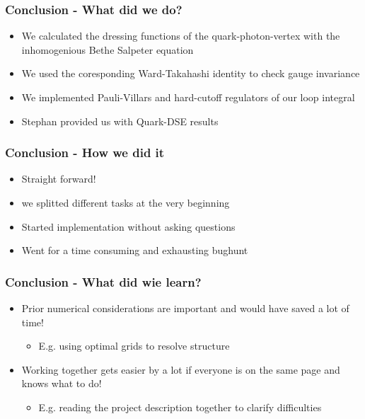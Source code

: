 \begin{frame}
	\frametitle{Conclusion - What did we do?}
			\begin{itemize}
				\item We calculated the dressing functions of the quark-photon-vertex with the inhomogenious Bethe Salpeter equation
					\vspace{2mm}
				\item We used the coresponding Ward-Takahashi identity to check gauge invariance
					\vspace{2mm}
				\item We implemented Pauli-Villars and hard-cutoff regulators of our loop integral 
					\vspace{2mm}
				\item Stephan provided us with Quark-DSE results
			\end{itemize}
\end{frame}

\begin{frame}
	\frametitle{Conclusion - How we did it} 
			\begin{itemize}
				\item Straight forward!
					\vspace{2mm}
				\item we splitted different tasks at the very beginning
					\vspace{2mm}
				\item Started implementation without asking questions
					\vspace{2mm}
				\item Went for a time consuming and exhausting bughunt
			\end{itemize}
\end{frame}


\begin{frame}
    \frametitle{Conclusion - What did wie learn?}
    \begin{itemize}
        \item Prior numerical considerations are important and would have saved a lot of time!
        	\begin{itemize}
        		\item E.g. using optimal grids to resolve structure
        	\end{itemize}
        		\vspace{3mm}
        \item Working together gets easier by a lot if everyone is on the same page and knows what to do!
        	\begin{itemize}
                \item E.g. reading the project description together to clarify difficulties
        	\end{itemize}
    \end{itemize}
\end{frame}
